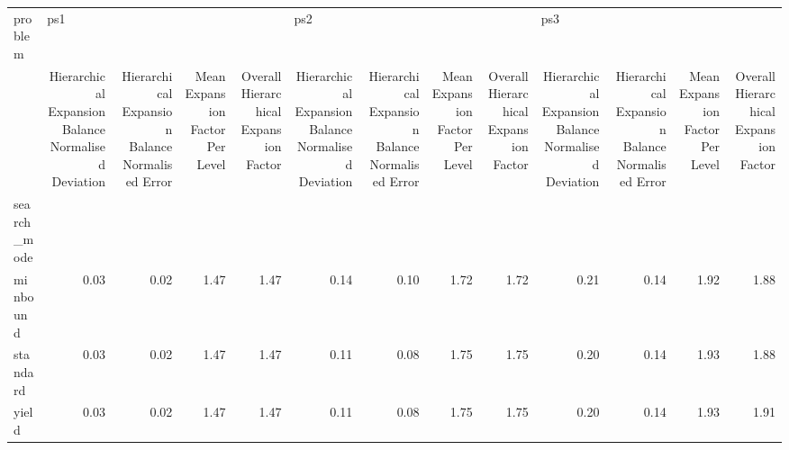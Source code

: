 \begin{tabular}{lrrrrrrrrrrrr}
\toprule
problem & \multicolumn{4}{l}{ps1} & \multicolumn{4}{l}{ps2} & \multicolumn{4}{l}{ps3} \\
{} & Hierarchical Expansion Balance Normalised Deviation & Hierarchical Expansion Balance Normalised Error & Mean Expansion Factor Per Level & Overall Hierarchical Expansion Factor & Hierarchical Expansion Balance Normalised Deviation & Hierarchical Expansion Balance Normalised Error & Mean Expansion Factor Per Level & Overall Hierarchical Expansion Factor & Hierarchical Expansion Balance Normalised Deviation & Hierarchical Expansion Balance Normalised Error & Mean Expansion Factor Per Level & Overall Hierarchical Expansion Factor \\
search\_mode &                                                     &                                                 &                                 &                                       &                                                     &                                                 &                                 &                                       &                                                     &                                                 &                                 &                                       \\
\midrule
minbound    &                                               0.03 &                                            0.02 &                            1.47 &                                  1.47 &                                               0.14 &                                            0.10 &                            1.72 &                                  1.72 &                                               0.21 &                                            0.14 &                            1.92 &                                  1.88 \\
standard    &                                               0.03 &                                            0.02 &                            1.47 &                                  1.47 &                                               0.11 &                                            0.08 &                            1.75 &                                  1.75 &                                               0.20 &                                            0.14 &                            1.93 &                                  1.88 \\
yield       &                                               0.03 &                                            0.02 &                            1.47 &                                  1.47 &                                               0.11 &                                            0.08 &                            1.75 &                                  1.75 &                                               0.20 &                                            0.14 &                            1.93 &                                  1.91 \\
\bottomrule
\end{tabular}
